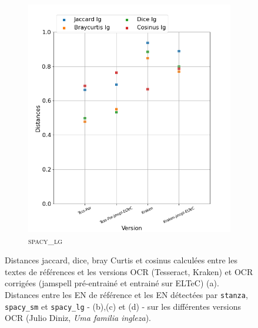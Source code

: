 \begin{figure}[H]
\begin{minipage}{6cm}
\begin{subfigure}{0.89\textwidth}
  \includegraphics[width=.89\textwidth]{IMAGES/ELTeC_DISTANCES_spaCy3.5.1/DINIZ-graph-dist-spaCy3.5.1-lg.png}
   \caption{\textsc{spacy\_lg}}
  \label{fig: }
  \end{subfigure}
  \end{minipage}
\caption{Distances jaccard, dice, bray Curtis et cosinus calculées entre les textes de références et les versions OCR (Tesseract, Kraken) et OCR corrigées (jamspell pré-entrainé et entrainé sur ELTeC) (a). Distances entre les EN de référence et les EN détectées par \texttt{stanza}, \texttt{spacy\_sm} et \texttt{spacy\_lg} - (b),(c) et (d) - sur les différentes versions OCR (Julio Diniz, \textit{Uma familia ingleza}).}
\label{fig:}
\end{figure}



